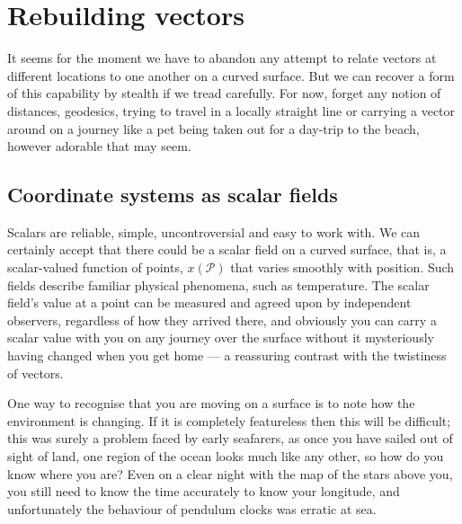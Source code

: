\section{Rebuilding vectors}

It seems for the moment we have to abandon any attempt to relate vectors at different locations to one another on a curved surface. But we can recover a form of this capability by stealth if we tread carefully. For now, forget any notion of distances, geodesics, trying to travel in a locally straight line or carrying a vector around on a journey like a pet being taken out for a day-trip to the beach, however adorable that may seem.

\subsection{Coordinate systems as scalar fields}

Scalars are reliable, simple, uncontroversial and easy to work with. We can certainly accept that there could be a scalar field on a curved surface, that is, a scalar-valued function of points, $x(\mathcal{P})$ that varies smoothly with position. Such fields describe familiar physical phenomena, such as temperature. The scalar field's value at a point can be measured and agreed upon by independent observers, regardless of how they arrived there, and obviously you can carry a scalar value with you on any journey over the surface without it mysteriously having changed when you get home --- a reassuring contrast with the twistiness of vectors.

One way to recognise that you are moving on a surface is to note how the environment is changing. If it is completely featureless then this will be difficult; this was surely a problem faced by early seafarers, as once you have sailed out of sight of land, one region of the ocean looks much like any other, so how do you know where you are? Even on a clear night with the map of the stars above you, you still need to know the time accurately to know your longitude, and unfortunately the behaviour of pendulum clocks was erratic at sea.

